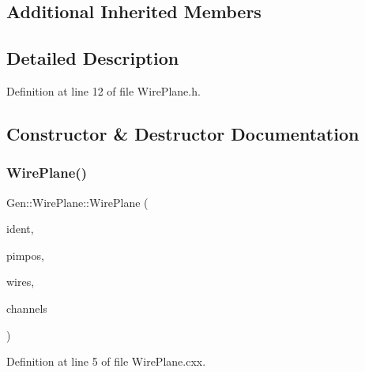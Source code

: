 \subsection*{Additional Inherited Members}


\subsection{Detailed Description}


Definition at line 12 of file Wire\+Plane.\+h.



\subsection{Constructor \& Destructor Documentation}
\mbox{\label{class_wire_cell_1_1_gen_1_1_wire_plane_a64a8d50a3e32e246387afc1afec6b3af}} 
\subsubsection{\texorpdfstring{Wire\+Plane()}{WirePlane()}}
{\footnotesize\ttfamily Gen\+::\+Wire\+Plane\+::\+Wire\+Plane (\begin{DoxyParamCaption}\item[{int}]{ident,  }\item[{\hyperlink{class_wire_cell_1_1_pimpos}{Pimpos} $\ast$}]{pimpos,  }\item[{const \hyperlink{class_wire_cell_1_1_i_data_ae1a9f863380499bb43f39fabb6276660}{I\+Wire\+::vector} \&}]{wires,  }\item[{const \hyperlink{class_wire_cell_1_1_i_data_ae1a9f863380499bb43f39fabb6276660}{I\+Channel\+::vector} \&}]{channels }\end{DoxyParamCaption})}



Definition at line 5 of file Wire\+Plane.\+cxx.

\mbox{\label{class_wire_cell_1_1_gen_1_1_wire_plane_ab2481388fc7fe04f367a34f92350851f}} 
